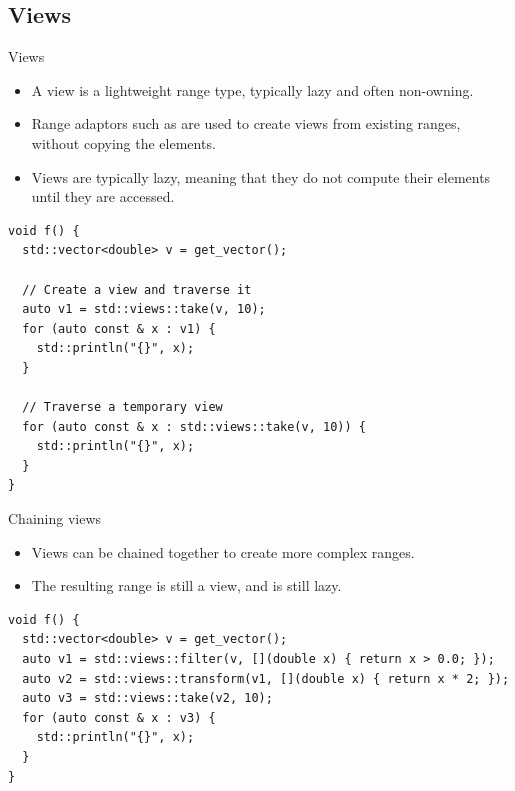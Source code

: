 \subsection{Views}

\begin{frame}[t,fragile]{Views}
\begin{itemize}
  \item A view is a lightweight range type, typically lazy and often non-owning.
  \item Range adaptors such as  are used to create views from existing ranges, without copying the elements.
  \item Views are typically lazy, meaning that they do not compute their elements until they are accessed.
\end{itemize}

\begin{lstlisting}
void f() {
  std::vector<double> v = get_vector();

  // Create a view and traverse it
  auto v1 = std::views::take(v, 10);
  for (auto const & x : v1) {
    std::println("{}", x);
  }

  // Traverse a temporary view
  for (auto const & x : std::views::take(v, 10)) {
    std::println("{}", x);
  }
}
\end{lstlisting}
\end{frame}

\begin{frame}[t,fragile]{Chaining views}
\begin{itemize}
  \item Views can be chained together to create more complex ranges.
  \item The resulting range is still a view, and is still lazy.
\end{itemize}

\begin{lstlisting}
void f() {
  std::vector<double> v = get_vector();
  auto v1 = std::views::filter(v, [](double x) { return x > 0.0; });
  auto v2 = std::views::transform(v1, [](double x) { return x * 2; });
  auto v3 = std::views::take(v2, 10);
  for (auto const & x : v3) {
    std::println("{}", x);
  }
}
\end{lstlisting}

\end{frame}

